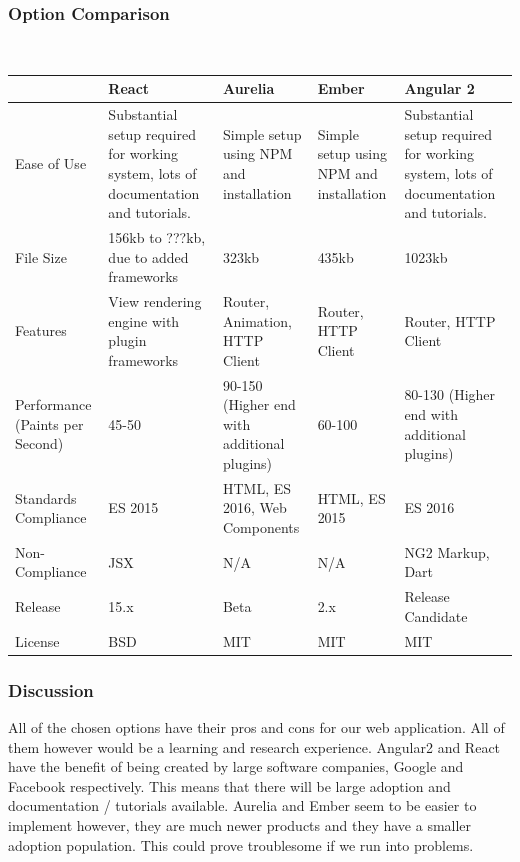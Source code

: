 \documentclass[onecolumn, draftclsnofoot,10pt, compsoc]{IEEEtran}
\begin{document}
{\newpage
\subsubsection{Option Comparison} ~\\

\tablehead{}
\begin{supertabular}{|p{2.5cm}|p{3.3cm}|p{3.3cm}|p{3.3cm}|p{3.3cm}|}
\hline
	\cite{Eisenberg}
	& React
	& Aurelia
	& Ember
	& Angular 2 \\
\hline
	Ease of Use
	& Substantial setup required for working system, lots of documentation and tutorials.
	& Simple setup using NPM and installation
	& Simple setup using NPM and installation
	& Substantial setup required for working system, lots of documentation and tutorials. \\
\hline
	File Size
	& 156kb to ???kb, due to added frameworks
	& 323kb & 435kb
	& 1023kb \\
\hline
	Features
	& View rendering engine with plugin frameworks
	& Router, Animation, HTTP Client & Router, HTTP Client
	& Router, HTTP Client \\
\hline
	Performance (Paints \hspace{3em} per Second)
	& 45-50 & 90-150 (Higher end with additional plugins)
	& 60-100 & 80-130 (Higher end with additional plugins) \\
\hline
	Standards \hspace{3em} Compliance
	& ES 2015
	& HTML, ES 2016, Web Components
	& HTML, ES 2015
	& ES 2016\\
\hline
	Non-Compliance
	& JSX
	& N/A
	& N/A
	& NG2 Markup, Dart \\
\hline
	Release
	& 15.x
	& Beta
	& 2.x
	& Release Candidate \\
\hline
	License
	& BSD
	& MIT
	& MIT
	& MIT \\
\hline
\end{supertabular}

\medskip

\subsubsection{Discussion}
\noindent All of the chosen options have their pros and cons for our web application. All of them however would be a learning and research experience. Angular2 and React have the benefit of being created by large software companies, Google and Facebook respectively. This means that there will be large adoption and documentation / tutorials available. Aurelia and Ember seem to be easier to implement however, they are much newer products and they have a smaller adoption population. This could prove troublesome if we run into problems.

}
\end{document}
